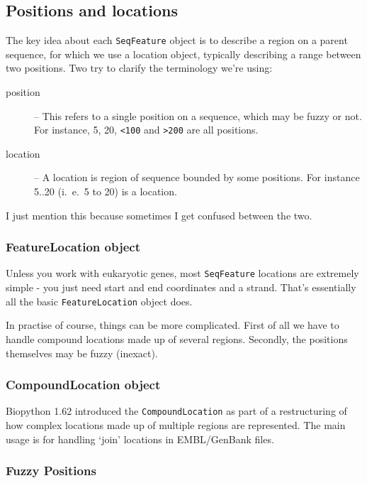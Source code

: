 \subsection{Positions and locations}
\label{sec:locations}

The key idea about each \verb|SeqFeature| object is to describe a
region on a parent sequence, for which we use a location object,
typically describing a range between two positions. Two try to
clarify the terminology we're using:

\begin{description}
  \item[position] -- This refers to a single position on a sequence,
  which may be fuzzy or not. For instance, 5, 20, \verb|<100| and
  \verb|>200| are all positions.

  \item[location] -- A location is region of sequence bounded by
  some positions. For instance 5..20 (i.~e.~5 to 20) is a location.
\end{description}

I just mention this because sometimes I get confused between the two.

\subsubsection{FeatureLocation object}

Unless you work with eukaryotic genes, most \verb|SeqFeature| locations are
extremely simple - you just need start and end coordinates and a strand.
That's essentially all the basic \verb|FeatureLocation| object does.


In practise of course, things can be more complicated. First of all
we have to handle compound locations made up of several regions.
Secondly, the positions themselves may be fuzzy (inexact).

\subsubsection{CompoundLocation object}

Biopython 1.62 introduced the \verb|CompoundLocation| as part of
a restructuring of how complex locations made up of multiple regions
are represented.
The main usage is for handling `join' locations in EMBL/GenBank files.


\subsubsection{Fuzzy Positions}

